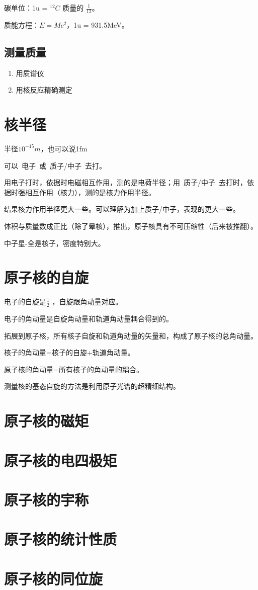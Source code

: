 碳单位：1u = $^{12}C$ 质量的 $\frac{1}{12}$。

质能方程：$E = Mc^2$，1u = 931.5MeV。

\subsection{测量质量}

\begin{enumerate}
    \item 用质谱仪
    \item 用核反应精确测定
\end{enumerate}

\section{核半径}

半径$10^{-15}m$，也可以说1fm

可以~电子~或~质子/中子~去打。

用电子打时，依据时电磁相互作用，测的是电荷半径；用~质子/中子~去打时，依据时强相互作用（核力），测的是核力作用半径。
 
结果核力作用半径更大一些。可以理解为加上质子/中子，表现的更大一些。

体积与质量数成正比（除了晕核），推出，原子核具有不可压缩性（后来被推翻）。

中子星-全是核子，密度特别大。

\section{原子核的自旋}

电子的自旋是$\frac{1}{2}$ ，自旋跟角动量对应。

电子的角动量是自旋角动量和轨道角动量耦合得到的。

拓展到原子核，所有核子自旋和轨道角动量的矢量和，构成了原子核的总角动量。

核子的角动量=核子的自旋+轨道角动量。

原子核的角动量=所有核子的角动量的耦合。

测量核的基态自旋的方法是利用原子光谱的超精细结构。

\section{原子核的磁矩}

\section{原子核的电四极矩}

\section{原子核的宇称}

\section{原子核的统计性质}

\section{原子核的同位旋}

\clearpage